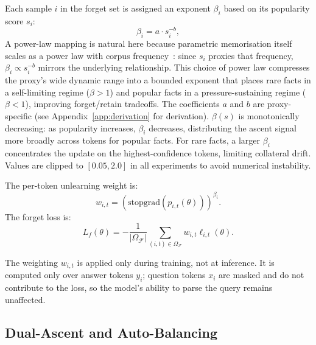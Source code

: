 Each sample $i$ in the forget set is assigned an exponent $\beta_i$ based on its popularity score $s_i$:
\begin{equation}
    \beta_i = a \cdot s_i^{-b},
\end{equation}
A power-law mapping is natural here because parametric memorisation itself scales as a power law with corpus frequency~\cite{kandpal2023large}: since $s_i$ proxies that frequency, $\beta_i \propto s_i^{-b}$ mirrors the underlying relationship. This choice of power law compresses the proxy’s wide dynamic range into a bounded exponent that places rare facts in a self-limiting regime ($\beta>1$) and popular facts in a pressure-sustaining regime ($\beta<1$), improving forget/retain tradeoffs. The coefficients $a$ and $b$ are proxy-specific (see Appendix~\ref{app:derivation} for derivation). $\beta(s)$ is monotonically decreasing: as popularity increases, $\beta_i$ decreases, distributing the ascent signal more broadly across tokens for popular facts. For rare facts, a larger $\beta_i$ concentrates the update on the highest-confidence tokens, limiting collateral drift. Values are clipped to $[0.05, 2.0]$ in all experiments to avoid numerical instability.

The per-token unlearning weight is:
\begin{equation}
w_{i,t} = \left(\mathrm{stopgrad}(p_{i,t}(\theta))\right)^{\beta_i}.
\end{equation}
The forget loss is:
\begin{equation}
L_f(\theta) = -\frac{1}{|\Omega_{\mathcal{F}}|} \sum_{(i,t) \in \Omega_{\mathcal{F}}} w_{i,t} \ell_{i,t}(\theta).
\end{equation}


The weighting $w_{i,t}$ is applied only during training, not at inference. It is computed only over answer tokens $y_i$; question tokens $x_i$ are masked and do not contribute to the loss, so the model's ability to parse the query remains unaffected.





\subsection{Dual-Ascent and Auto-Balancing}\label{sec:dual_ascent}

